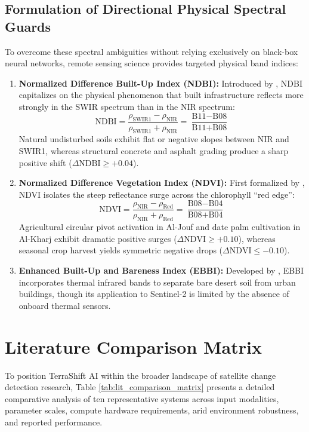 \subsection{Formulation of Directional Physical Spectral Guards}
To overcome these spectral ambiguities without relying exclusively on black-box neural networks, remote sensing science provides targeted physical band indices:
\begin{enumerate}
    \item \textbf{Normalized Difference Built-Up Index (NDBI):} Introduced by \citet{zha2003use}, NDBI capitalizes on the physical phenomenon that built infrastructure reflects more strongly in the SWIR spectrum than in the NIR spectrum:
    \begin{equation}
        \text{NDBI} = \frac{\rho_{\text{SWIR1}} - \rho_{\text{NIR}}}{\rho_{\text{SWIR1}} + \rho_{\text{NIR}}} = \frac{\text{B11} - \text{B08}}{\text{B11} + \text{B08}}
        \label{eq:ndbi_formulation}
    \end{equation}
    Natural undisturbed soils exhibit flat or negative slopes between NIR and SWIR1, whereas structural concrete and asphalt grading produce a sharp positive shift ($\Delta\text{NDBI} \ge +0.04$).
    \item \textbf{Normalized Difference Vegetation Index (NDVI):} First formalized by \citet{rouse1974monitoring}, NDVI isolates the steep reflectance surge across the chlorophyll ``red edge'':
    \begin{equation}
        \text{NDVI} = \frac{\rho_{\text{NIR}} - \rho_{\text{Red}}}{\rho_{\text{NIR}} + \rho_{\text{Red}}} = \frac{\text{B08} - \text{B04}}{\text{B08} + \text{B04}}
        \label{eq:ndvi_formulation}
    \end{equation}
    Agricultural circular pivot activation in Al-Jouf and date palm cultivation in Al-Kharj exhibit dramatic positive surges ($\Delta\text{NDVI} \ge +0.10$), whereas seasonal crop harvest yields symmetric negative drops ($\Delta\text{NDVI} \le -0.10$).
    \item \textbf{Enhanced Built-Up and Bareness Index (EBBI):} Developed by \citet{assyakur2012enhanced}, EBBI incorporates thermal infrared bands to separate bare desert soil from urban buildings, though its application to Sentinel-2 is limited by the absence of onboard thermal sensors.
\end{enumerate}

\section{Literature Comparison Matrix}
\label{sec:lit_matrix}
To position TerraShift AI within the broader landscape of satellite change detection research, Table \ref{tab:lit_comparison_matrix} presents a detailed comparative analysis of ten representative systems across input modalities, parameter scales, compute hardware requirements, arid environment robustness, and reported performance.

